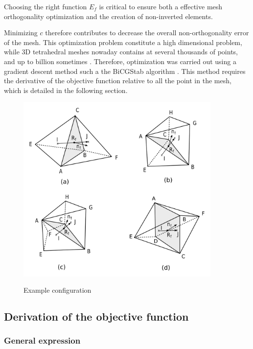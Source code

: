 \documentclass[11pt]{article}
\begin{document}
Choosing the right function $E_f$ is critical to ensure both a effective mesh orthogonality optimization and the creation of non-inverted elements. 

Minimizing $c$ therefore contributes to decrease the overall non-orthogonality error of the mesh.
This optimization problem constitute a high dimensional problem, while 3D tetrahedral meshes nowaday contains at several thousands of points, and up to billion sometimes \cite{neau_massively_2020}.
Therefore, optimization was carried out using a gradient descent method such a the BiCGStab algorithm \cite{}.
This method requires the derivative of the objective function relative to all the point in the mesh, which is detailed in the following section.



\begin{figure}[h]
  \centering
  \includegraphics[width=0.9\textwidth]{figures/cases.png}
  \label{cases_figure}
  \caption{Example configuration}
\end{figure}


\subsection{Derivation of the objective function}

\subsubsection{General expression}
\end{document}
